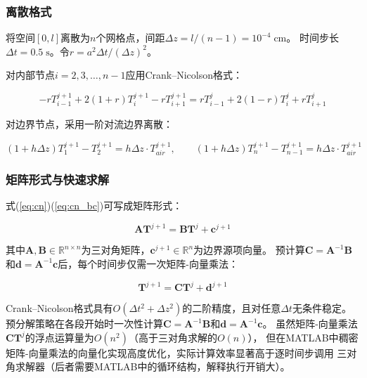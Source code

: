\documentclass[12pt,a4paper]{ctexart}
\begin{document}
\subsubsection{离散格式}

将空间$[0,l]$离散为$n$个网格点，间距$\Delta z = l/(n-1)=10^{-4}\;\mathrm{cm}$。
时间步长$\Delta t = 0.5\;\mathrm{s}$。令$r = a^2\Delta t/(\Delta z)^2$。

对内部节点$i=2,3,\dots,n-1$应用Crank--Nicolson格式\cite{ref2,ref3}：

\begin{equation}\label{eq:cn}
-r T_{i-1}^{j+1} + 2(1+r)T_i^{j+1} - r T_{i+1}^{j+1}
= r T_{i-1}^{j} + 2(1-r)T_i^{j} + r T_{i+1}^{j}
\end{equation}

对边界节点，采用一阶对流边界离散：

\begin{equation}\label{eq:cn_bc}
(1+h\Delta z)T_1^{j+1} - T_2^{j+1} = h\Delta z \cdot T_{air}^{j+1},\qquad
(1+h\Delta z)T_n^{j+1} - T_{n-1}^{j+1} = h\Delta z \cdot T_{air}^{j+1}
\end{equation}

\subsubsection{矩阵形式与快速求解}

式(\ref{eq:cn})(\ref{eq:cn_bc})可写成矩阵形式：

\begin{equation}\label{eq:matrix}
\mathbf{A}\mathbf{T}^{j+1} = \mathbf{B}\mathbf{T}^{j} + \mathbf{c}^{j+1}
\end{equation}

其中$\mathbf{A},\mathbf{B}\in\mathbb{R}^{n\times n}$为三对角矩阵，$\mathbf{c}^{j+1}\in\mathbb{R}^{n}$为边界源项向量。
预计算$\mathbf{C}=\mathbf{A}^{-1}\mathbf{B}$和$\mathbf{d}=\mathbf{A}^{-1}\mathbf{c}$后，每个时间步仅需一次矩阵-向量乘法：

\begin{equation}\label{eq:fast}
\mathbf{T}^{j+1} = \mathbf{C}\mathbf{T}^{j} + \mathbf{d}^{j+1}
\end{equation}

Crank--Nicolson格式具有$O(\Delta t^2 + \Delta z^2)$的二阶精度，且对任意$\Delta t$无条件稳定。
预分解策略在各段开始时一次性计算$\mathbf{C}=\mathbf{A}^{-1}\mathbf{B}$和$\mathbf{d}=\mathbf{A}^{-1}\mathbf{c}$。
虽然矩阵-向量乘法$\mathbf{C}\mathbf{T}^{j}$的浮点运算量为$O(n^2)$（高于三对角求解的$O(n)$），
但在MATLAB中稠密矩阵-向量乘法的向量化实现高度优化，实际计算效率显著高于逐时间步调用
三对角求解器（后者需要MATLAB中的循环结构，解释执行开销大）。
\end{document}
